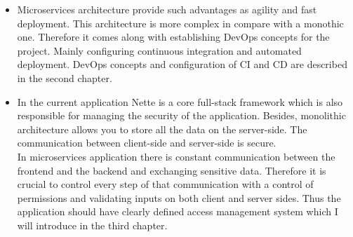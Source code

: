 \begin{itemize}
    \item Microservices architecture provide such advantages as agility and fast deployment. This architecture is more complex in compare with a monothic one. Therefore it comes along with establishing DevOps concepts for the project. Mainly configuring continuous integration and automated deployment. DevOps concepts and configuration of CI and CD are described in the second chapter.
    \item In the current application Nette is a core full-stack framework which is also responsible for managing the security of the application. Besides, monolithic architecture allows you to store all the data on the server-side. The communication between client-side and server-side is secure.\\
    In microservices application there is constant communication between the frontend and the backend and exchanging sensitive data. Therefore it is crucial to control every step of that communication with a control of permissions and validating inputs on both client and server sides. Thus the application should have clearly defined access management system which I will introduce in the third chapter.
\end{itemize}
